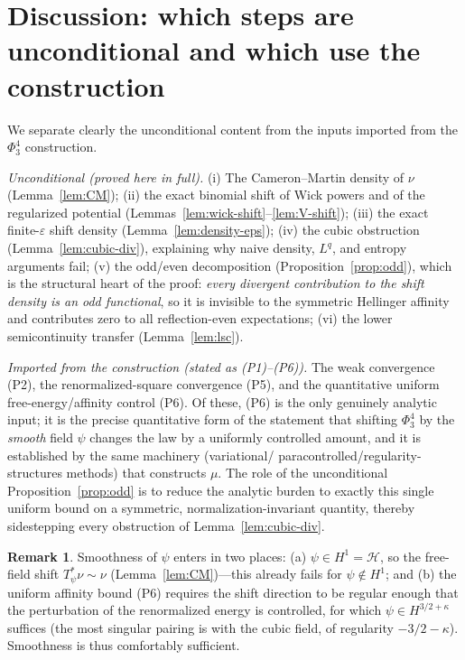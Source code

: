 \documentclass[12pt]{article}
\newcommand{\cH}{\mathcal{H}}
\newcommand{\eps}{\varepsilon}
\theoremstyle{plain}
\theoremstyle{definition}
\newtheorem{remark}{Remark}
\begin{document}
\section{Discussion: which steps are unconditional and which use the construction}

We separate clearly the unconditional content from the inputs imported from the
$\Phi^4_3$ construction.

\emph{Unconditional (proved here in full).}
(i) The Cameron--Martin density of $\nu$ (Lemma~\ref{lem:CM}); (ii) the exact
binomial shift of Wick powers and of the regularized potential
(Lemmas~\ref{lem:wick-shift}--\ref{lem:V-shift}); (iii) the exact finite-$\eps$
shift density (Lemma~\ref{lem:density-eps}); (iv) the cubic obstruction
(Lemma~\ref{lem:cubic-div}), explaining why naive density, $L^q$, and entropy
arguments fail; (v) the odd/even decomposition (Proposition~\ref{prop:odd}), which
is the structural heart of the proof: \emph{every divergent contribution to the shift
density is an odd functional}, so it is invisible to the symmetric Hellinger affinity
and contributes zero to all reflection-even expectations; (vi) the lower
semicontinuity transfer (Lemma~\ref{lem:lsc}).

\emph{Imported from the construction (stated as (P1)--(P6)).}
The weak convergence (P2), the renormalized-square convergence (P5), and the
quantitative uniform free-energy/affinity control (P6). Of these, (P6) is the only
genuinely analytic input; it is the precise quantitative form of the statement that
shifting $\Phi^4_3$ by the \emph{smooth} field $\psi$ changes the law by a uniformly
controlled amount, and it is established by the same machinery (variational/
paracontrolled/regularity-structures methods) that constructs $\mu$. The role of the
unconditional Proposition~\ref{prop:odd} is to reduce the analytic burden to exactly
this single uniform bound on a symmetric, normalization-invariant quantity, thereby
sidestepping every obstruction of Lemma~\ref{lem:cubic-div}.

\begin{remark}
Smoothness of $\psi$ enters in two places: (a) $\psi\in H^1=\cH$, so the free-field
shift $T_\psi^*\nu\sim\nu$ (Lemma~\ref{lem:CM})---this already fails for $\psi\notin H^1$;
and (b) the uniform affinity bound (P6) requires the shift direction to be regular
enough that the perturbation of the renormalized energy is controlled, for which
$\psi\in H^{3/2+\kappa}$ suffices (the most singular pairing is with the cubic field,
of regularity $-3/2-\kappa$). Smoothness is thus comfortably sufficient.
\end{remark}
\end{document}
